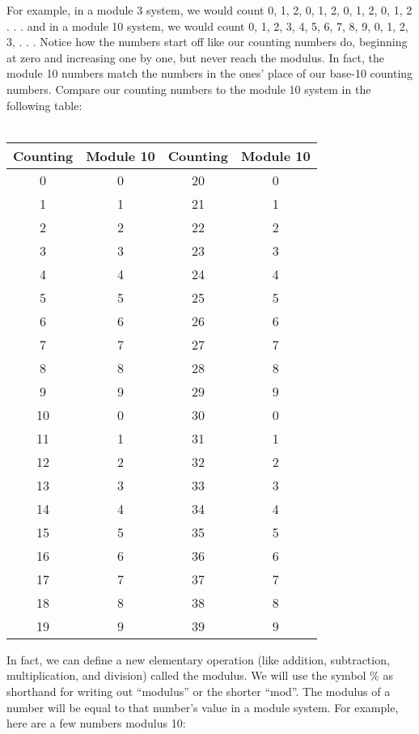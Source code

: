 \documentclass{article}
\begin{document}
    For example, in a module 3 system, we would count 
    0, 1, 2, 0, 1, 2, 0, 1, 2, 0, 1, 2 . . . 
    and in a module 10 system, we would count 
    0, 1, 2, 3, 4, 5, 6, 7, 8, 9, 0, 1, 2, 3, . . . 
    Notice how the numbers start off like our counting numbers do, 
    beginning at zero and increasing one by one, but never reach the modulus. 
    In fact, the module 10 numbers match the numbers in the ones' place of our 
    base-10 counting numbers. 
    Compare our counting numbers to the module 10 system in the following table:\\\\
    \begin{center}
    \begin{tabular}{| c | c || c | c |}\hline
      Counting & Module 10 & Counting & Module 10 \\\hline\hline
      0 & 0 & 20 & 0 \\\hline
      1 & 1 & 21 & 1 \\\hline
      2 & 2 & 22 & 2 \\\hline
      3 & 3 & 23 & 3 \\\hline
      4 & 4 & 24 & 4 \\\hline
      5 & 5 & 25 & 5 \\\hline
      6 & 6 & 26 & 6 \\\hline
      7 & 7 & 27 & 7 \\\hline
      8 & 8 & 28 & 8 \\\hline
      9 & 9 & 29 & 9 \\\hline
      10 & 0 & 30 & 0 \\\hline
      11 & 1 & 31 & 1 \\\hline
      12 & 2 & 32 & 2 \\\hline
      13 & 3 & 33 & 3 \\\hline
      14 & 4 & 34 & 4 \\\hline
      15 & 5 & 35 & 5 \\\hline
      16 & 6 & 36 & 6 \\\hline
      17 & 7 & 37 & 7 \\\hline
      18 & 8 & 38 & 8 \\\hline
      19 & 9 & 39 & 9 \\\hline
    \end{tabular}
    \end{center}
\newpage
    In fact, we can define a new elementary operation 
    (like addition, subtraction, multiplication, and division) 
    called the modulus. We will use the symbol \% as shorthand for writing out 
    “modulus” or the shorter “mod”. The modulus of a number will be equal to that 
    number's value in a module system. For example, here are a few numbers modulus 10:\\
\end{document}
